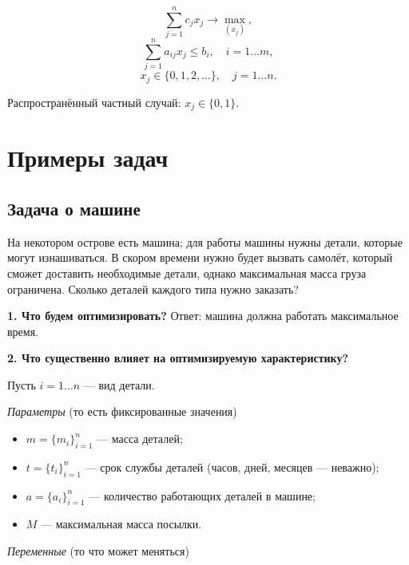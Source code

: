 

\[\sum_{j=1}^{n} c_j x_j \to \max_{(x_j)},\]
\[\sum_{j=1}^{n}a_{ij} x_j \le b_i, \quad i = 1\dots m,\]
\[x_j \in \{0, 1, 2, \dots\}, \quad j = 1\dots n.\]

Распространённый частный случай: $x_j \in \{0, 1\}$.

\section{Примеры задач}

\subsection{Задача о машине}

\problem\label{pr:car_on_island}

На некотором острове есть машина; для работы машины нужны детали, которые могут изнашиваться. В скором времени нужно будет вызвать самолёт, который сможет доставить необходимые детали, однако максимальная масса груза ограничена. Сколько деталей каждого типа нужно заказать?

\bigskip

\textbf{1. Что будем оптимизировать?} Ответ: машина должна работать максимальное время.

\bigskip

\textbf{2. Что существенно влияет на оптимизируемую характеристику?}

Пусть $i = 1 \dots n$ --- вид детали.

\bigskip

\textit{Параметры} (то есть фиксированные значения)

\begin{itemize}[nosep]
	\item $m = \{m_i\}_{i=1}^n$ --- масса деталей;
	
	\item $t = \{t_i\}_{i=1}^n$ --- срок службы деталей (часов, дней, месяцев --- неважно);

	\item $a = \{a_i\}_{i=1}^n$ --- количество работающих деталей в машине;
	
	\item $M$ --- максимальная масса посылки.
\end{itemize}

\bigskip

\textit{Переменные} (то что может меняться)

